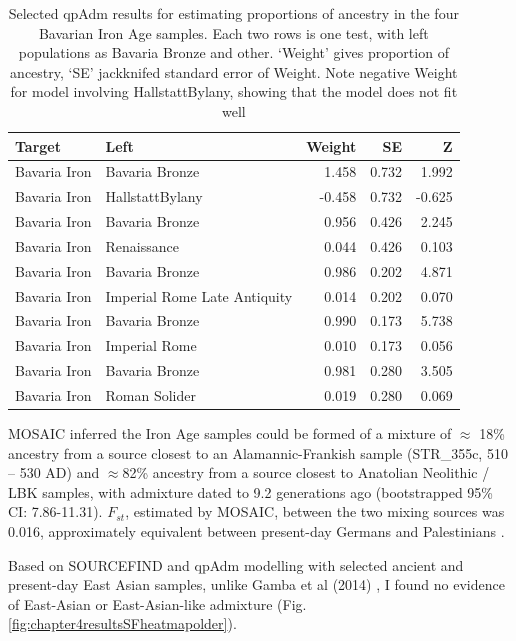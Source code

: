 \begin{table}
\centering
\begin{tabular}[t]{llrrr}
\toprule
Target & Left & Weight & SE & Z\\
\midrule
Bavaria Iron & Bavaria Bronze & 1.458 & 0.732 & 1.992\\
Bavaria Iron & HallstattBylany & -0.458 & 0.732 & -0.625\\
\addlinespace
Bavaria Iron & Bavaria Bronze & 0.956 & 0.426 & 2.245\\
Bavaria Iron & Renaissance & 0.044 & 0.426 & 0.103\\
\addlinespace
Bavaria Iron & Bavaria Bronze & 0.986 & 0.202 & 4.871\\
Bavaria Iron & Imperial Rome Late Antiquity & 0.014 & 0.202 & 0.070\\
\addlinespace
Bavaria Iron & Bavaria Bronze & 0.990 & 0.173 & 5.738\\
Bavaria Iron & Imperial Rome & 0.010 & 0.173 & 0.056\\
\addlinespace
Bavaria Iron & Bavaria Bronze & 0.981 & 0.280 & 3.505\\
Bavaria Iron & Roman Solider & 0.019 & 0.280 & 0.069\\
\bottomrule
\end{tabular}
\caption{Selected qpAdm results for estimating proportions of ancestry in the four Bavarian Iron Age samples. Each two rows is one test, with left populations as Bavaria Bronze and other. `Weight' gives proportion of ancestry, `SE' jackknifed standard error of Weight. Note negative Weight for model involving  HallstattBylany, showing that the model does not fit well}
\label{tab:IronAge_qpAdm}
\end{table}


MOSAIC inferred the Iron Age samples could be formed of a mixture of $\approx$ 18\% ancestry from a source closest to an Alamannic-Frankish sample (STR\_355c, 510 – 530 AD) and $\approx$82\% ancestry from a source closest to Anatolian Neolithic / LBK samples, with admixture dated to 9.2 generations ago (bootstrapped 95\% CI: 7.86-11.31). $F_{st}$, estimated by MOSAIC, between the two mixing sources was 0.016, approximately equivalent between present-day Germans and Palestinians \cite{nelis2009genetic}.  


Based on SOURCEFIND and qpAdm modelling with selected ancient and present-day East Asian samples, unlike Gamba et al (2014) \cite{Gamba2014}, I found no evidence of East-Asian or East-Asian-like admixture (Fig. \ref{fig:chapter4resultsSFheatmapolder}).



